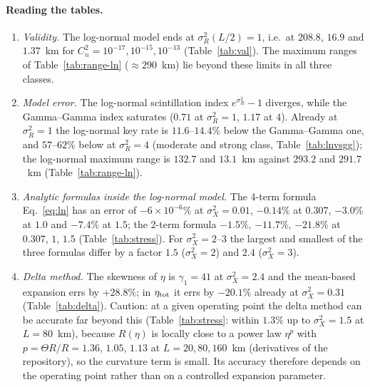 \documentclass[11pt,a4paper]{article}
\theoremstyle{plain}
\theoremstyle{remark}
\begin{document}
\paragraph{Reading the tables.}
\begin{enumerate}
\item \emph{Validity.} The log-normal model ends at $\sigma_R^2(L/2)=1$, i.e.\ at $208.8$, $16.9$ and $1.37$~km for $C_n^2=10^{-17},10^{-15},10^{-13}$ (Table~\ref{tab:val}). The maximum ranges of Table~\ref{tab:range-ln} ($\approx290$~km) lie beyond these limits in all three classes.
\item \emph{Model error.} The log-normal scintillation index $e^{\sigma_R^2}-1$ diverges, while the Gamma--Gamma index saturates ($0.71$ at $\sigma_R^2=1$, $1.17$ at $4$). Already at $\sigma_R^2=1$ the log-normal key rate is $11.6$--$14.4\%$ below the Gamma--Gamma one, and $57$--$62\%$ below at $\sigma_R^2=4$ (moderate and strong class, Table~\ref{tab:lnvsgg}); the log-normal maximum range is $132.7$ and $13.1$~km against $293.2$ and $291.7$~km (Table~\ref{tab:range-ln}).
\item \emph{Analytic formulas inside the log-normal model.} The 4-term formula Eq.~\eqref{eq:ln} has an error of $-6\times10^{-6}\%$ at $\sigma_X^2=0.01$, $-0.14\%$ at $0.307$, $-3.0\%$ at $1.0$ and $-7.4\%$ at $1.5$; the 2-term formula $-1.5\%$, $-11.7\%$, $-21.8\%$ at $0.307$, $1$, $1.5$ (Table~\ref{tab:stress}). For $\sigma_X^2=2$--$3$ the largest and smallest of the three formulas differ by a factor $1.5$ ($\sigma_X^2=2$) and $2.4$ ($\sigma_X^2=3$).
\item \emph{Delta method.} The skewness of $\eta$ is $\gamma_1=41$ at $\sigma_X^2=2.4$ and the mean-based expansion errs by $+28.8\%$; in $\eta_{\rm tot}$ it errs by $-20.1\%$ already at $\sigma_X^2=0.31$ (Table~\ref{tab:delta}). Caution: at a given operating point the delta method can be accurate far beyond this (Table~\ref{tab:stress}: within $1.3\%$ up to $\sigma_X^2=1.5$ at $L=80$~km), because $R(\eta)$ is locally close to a power law $\eta^{p}$ with $p=\Theta R/R=1.36,\,1.05,\,1.13$ at $L=20,80,160$~km (derivatives of the repository), so the curvature term is small. Its accuracy therefore depends on the operating point rather than on a controlled expansion parameter.
\end{enumerate}
\end{document}
